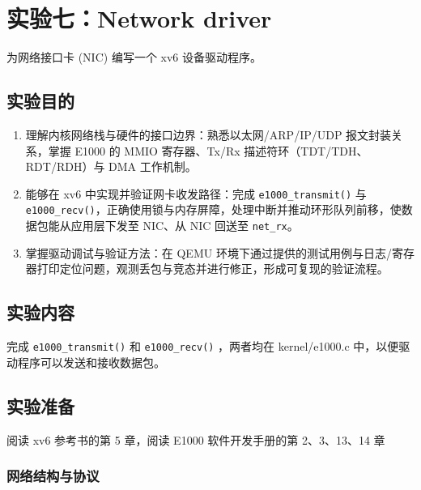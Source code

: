 \section{实验七：Network driver}\label{sec:Network_driver}

为网络接口卡 (NIC) 编写一个 xv6 设备驱动程序。

\subsection{实验目的}

\begin{enumerate}
	\item 理解内核网络栈与硬件的接口边界：熟悉以太网/ARP/IP/UDP 报文封装关系，掌握 E1000 的 MMIO 寄存器、Tx/Rx 描述符环（TDT/TDH、RDT/RDH）与 DMA 工作机制。
	\item 能够在 xv6 中实现并验证网卡收发路径：完成 \texttt{e1000\_transmit()} 与 \texttt{e1000\_recv()}，正确使用锁与内存屏障，处理中断并推动环形队列前移，使数据包能从应用层下发至 NIC、从 NIC 回送至 \texttt{net\_rx}。
	\item 掌握驱动调试与验证方法：在 QEMU 环境下通过提供的测试用例与日志/寄存器打印定位问题，观测丢包与竞态并进行修正，形成可复现的验证流程。
\end{enumerate}

\subsection{实验内容}

完成 \texttt{e1000\_transmit()} 和 \texttt{e1000\_recv()} ，两者均在 kernel/e1000.c 中，以便驱动程序可以发送和接收数据包。

\subsection{实验准备}

阅读 xv6 参考书的第 5 章，阅读 E1000 软件开发手册的第 2、3、13、14 章

\subsubsection{网络结构与协议}

